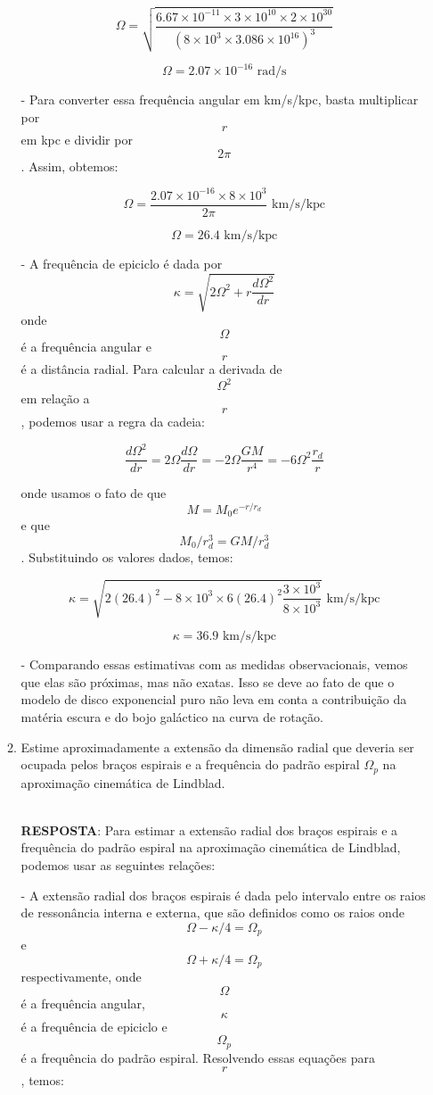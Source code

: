 \documentclass[a4paper,12pt]{article}
\begin{document}
\begin{enumerate}
\begin{enumerate}
$$\Omega = \sqrt{\frac{6.67\times 10^{-11} \times 3\times 10^{10} \times 2\times 10^{30}}{(8\times 10^3 \times 3.086\times 10^{16})^3}}$$

$$\Omega = 2.07\times 10^{-16} \text{ rad/s}$$

- Para converter essa frequência angular em km/s/kpc, basta multiplicar por $$r$$ em kpc e dividir por $$2\pi$$. Assim, obtemos:

$$\Omega = \frac{2.07\times 10^{-16} \times 8\times 10^3}{2\pi} \text{ km/s/kpc}$$

$$\Omega = 26.4 \text{ km/s/kpc}$$

- A frequência de epiciclo é dada por $$\kappa = \sqrt{2\Omega^2 + r\frac{d\Omega^2}{dr}}$$ onde $$\Omega$$ é a frequência angular e $$r$$ é a distância radial. Para calcular a derivada de $$\Omega^2$$ em relação a $$r$$, podemos usar a regra da cadeia:

$$\frac{d\Omega^2}{dr} = 2\Omega \frac{d\Omega}{dr} = -2\Omega \frac{GM}{r^4} = -6\Omega^2 \frac{r_d}{r}$$

onde usamos o fato de que $$M = M_0 e^{-r/r_d}$$ e que $$M_0/r_d^3 = G M/r_d^3$$. Substituindo os valores dados, temos:

$$\kappa = \sqrt{2(26.4)^2 - 8\times 10^3 \times 6(26.4)^2 \frac{3\times 10^3}{8\times 10^3}} \text{ km/s/kpc}$$

$$\kappa = 36.9 \text{ km/s/kpc}$$

- Comparando essas estimativas com as medidas observacionais, vemos que elas são próximas, mas não exatas. Isso se deve ao fato de que o modelo de disco exponencial puro não leva em conta a contribuição da matéria escura e do bojo galáctico na curva de rotação.

\noindent\hrulefill

\item Estime aproximadamente a extensão da dimensão radial que deveria ser 
ocupada pelos braços espirais e a frequência do padrão espiral $\Omega_p$ na 
aproximação cinemática de Lindblad.

\noindent\hrulefill\\\textbf{RESPOSTA}: Para estimar a extensão radial dos braços espirais e a frequência do padrão espiral na aproximação cinemática de Lindblad, podemos usar as seguintes relações:

- A extensão radial dos braços espirais é dada pelo intervalo entre os raios de ressonância interna e externa, que são definidos como os raios onde $$\Omega - \kappa/4 = \Omega_p$$ e $$\Omega + \kappa/4 = \Omega_p$$ respectivamente, onde $$\Omega$$ é a frequência angular, $$\kappa$$ é a frequência de epiciclo e $$\Omega_p$$ é a frequência do padrão espiral. Resolvendo essas equações para $$r$$, temos:


\end{enumerate}
\end{enumerate}
\end{document}
